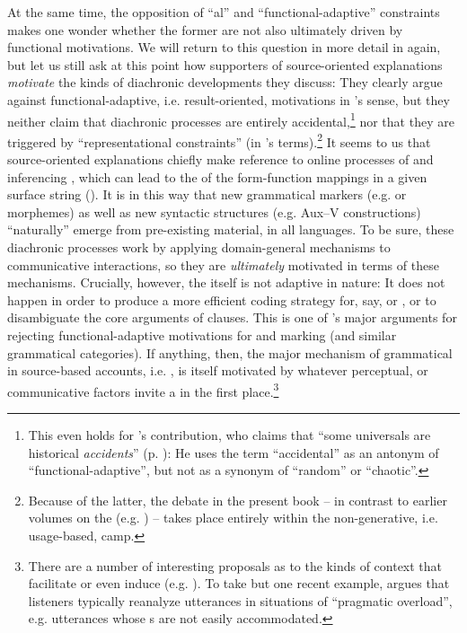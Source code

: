 \documentclass[output=paper]{langsci/langscibook}
\begin{document}
At the same time, the opposition of “al” and “functional-adaptive” constraints makes one wonder whether the former are not also ultimately driven by functional motivations. We will return to this question in more detail in  again, but let us still ask at this point how supporters of source-oriented explanations \textit{motivate} the kinds of diachronic developments they discuss: They clearly argue against functional-adaptive, i.e. result-oriented, motivations in ’s sense, but they neither claim that diachronic processes are entirely accidental,\footnote{This even holds for ’s contribution, who claims that “some universals are historical \textit{accidents}” (p. \pageref{p:collins:historicalaccidents}): He uses the term “accidental” as an anto\-nym of “functional-adaptive”, but not as a synonym of “random” or “chaotic”.} nor that they are triggered by  “representational constraints” (in ’s terms).\footnote{Because of the latter, the debate in the present book – in contrast to earlier volumes on the  (e.g. \citealt{Hawkins1988_ExplEd,Good2008_Change}) – takes place entirely within the non-generative, i.e. usage-based, camp.} It seems to us that source-oriented explanations chiefly make reference to online processes of  and inferencing \citep{Bybee2010}, which can lead to the  of the form-function mappings in a given surface string (\citealt{Croft2000,DeSmet2009}). It is in this way that new grammatical markers (e.g.  or  morphemes) as well as new syntactic structures (e.g. Aux–V constructions) “naturally” emerge from pre-existing material, in all languages. To be sure, these diachronic processes work by applying domain-general  mechanisms to communicative interactions, so they are \textit{ultimately} motivated in terms of these mechanisms. Crucially, however, the  itself is not adaptive in nature: It does not happen in order to produce a more efficient coding strategy for, say,  or , or to disambiguate the core arguments of  clauses. This is one of ’s major arguments for rejecting functional-adaptive motivations for  and  marking (and similar grammatical categories). If anything, then, the major mechanism of grammatical  in source-based accounts, i.e. , is itself motivated by whatever perceptual,  or communicative factors invite a  in the first place.\footnote{There 
\label{fn:epilog:8}
are a number of interesting proposals as to the kinds of context that facilitate or even induce  (e.g. \citealt{DetgesWaltereit2002,HansenWaltereit2006,RosemeyerGrossman2017,SchwenterWaltereit2009,TraugottDasher2002}). To take but one recent example, \citet{Eckardt2009} argues that listeners typically reanalyze utterances in situations of “pragmatic overload”, e.g. utterances whose s are not easily accommodated.}
\end{document}
